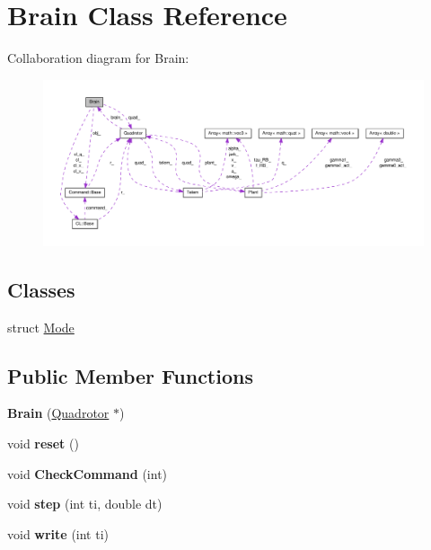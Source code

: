 \hypertarget{classBrain}{\section{\-Brain \-Class \-Reference}
\label{classBrain}
}


\-Collaboration diagram for \-Brain\-:\nopagebreak
\begin{figure}[H]
\begin{center}
\leavevmode
\includegraphics[width=350pt]{classBrain__coll__graph}
\end{center}
\end{figure}
\subsection*{\-Classes}
\begin{DoxyCompactItemize}
\item 
struct \hyperlink{structBrain_1_1Mode}{\-Mode}
\end{DoxyCompactItemize}
\subsection*{\-Public \-Member \-Functions}
\begin{DoxyCompactItemize}
\item 
\hypertarget{classBrain_ad661eb184de49991281a1913d71dbad5}{{\bfseries \-Brain} (\hyperlink{classQuadrotor}{\-Quadrotor} $\ast$)}\label{classBrain_ad661eb184de49991281a1913d71dbad5}

\item 
\hypertarget{classBrain_ab45d9d639fdf6fa9f7d24e3f4272d35f}{void {\bfseries reset} ()}\label{classBrain_ab45d9d639fdf6fa9f7d24e3f4272d35f}

\item 
\hypertarget{classBrain_af0033e0a76b1dbab2935ca93b1008dad}{void {\bfseries \-Check\-Command} (int)}\label{classBrain_af0033e0a76b1dbab2935ca93b1008dad}

\item 
\hypertarget{classBrain_a7f03601463650611a436793da2b80abd}{void {\bfseries step} (int ti, double dt)}\label{classBrain_a7f03601463650611a436793da2b80abd}

\item 
\hypertarget{classBrain_a3117d293a1087e00f2ba05cf3099a0ae}{void {\bfseries write} (int ti)}\label{classBrain_a3117d293a1087e00f2ba05cf3099a0ae}

\end{DoxyCompactItemize}

